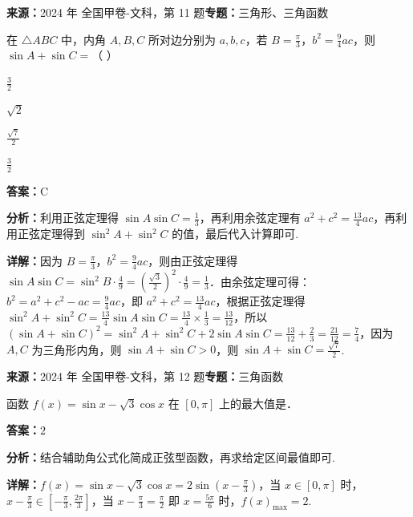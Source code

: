 \begin{question}[points=5]
\textbf{来源：}2024 年 全国甲卷-文科，第 11 题\quad \textbf{专题：}三角形、三角函数\par
在 $\triangle ABC$ 中，内角 $A, B, C$ 所对边分别为 $a, b, c$，若 $B = \frac{\pi}{3}$，$b^2 = \frac{9}{4}ac$，则 $\sin A + \sin C =$（ ）
\begin{choices}
  \item $\frac{3}{2}$
  \item $\sqrt{2}$
  \item $\frac{\sqrt{7}}{2}$
  \item $\frac{3}{2}$
\end{choices}
\begin{solution}
\textbf{答案：}C

\textbf{分析：}利用正弦定理得 $\sin A \sin C = \frac{1}{3}$，再利用余弦定理有 $a^2 + c^2 = \frac{13}{4}ac$，再利用正弦定理得到 $\sin^2 A + \sin^2 C$ 的值，最后代入计算即可.

\textbf{详解：}因为 $B = \frac{\pi}{3}$，$b^2 = \frac{9}{4}ac$，则由正弦定理得 $\sin A \sin C = \sin^2 B \cdot \frac{4}{9} = \left(\frac{\sqrt{3}}{2}\right)^2 \cdot \frac{4}{9} = \frac{1}{3}$．由余弦定理可得：$b^2 = a^2 + c^2 - ac = \frac{9}{4}ac$，即 $a^2 + c^2 = \frac{13}{4}ac$，根据正弦定理得 $\sin^2 A + \sin^2 C = \frac{13}{4} \sin A \sin C = \frac{13}{4} \times \frac{1}{3} = \frac{13}{12}$，所以 $(\sin A + \sin C)^2 = \sin^2 A + \sin^2 C + 2\sin A \sin C = \frac{13}{12} + \frac{2}{3} = \frac{21}{12} = \frac{7}{4}$，因为 $A, C$ 为三角形内角，则 $\sin A + \sin C > 0$，则 $\sin A + \sin C = \frac{\sqrt{7}}{2}$.
\end{solution}
\end{question}

\begin{question}[points=5]
\textbf{来源：}2024 年 全国甲卷-文科，第 12 题\quad \textbf{专题：}三角函数\par
函数 $f(x) = \sin x - \sqrt{3} \cos x$ 在 $[0, \pi]$ 上的最大值是．
\fillin[{$2$}]
\begin{solution}
\textbf{答案：}$2$

\textbf{分析：}结合辅助角公式化简成正弦型函数，再求给定区间最值即可.

\textbf{详解：}$f(x) = \sin x - \sqrt{3} \cos x = 2\sin\left(x - \frac{\pi}{3}\right)$，当 $x \in [0, \pi]$ 时，$x - \frac{\pi}{3} \in [-\frac{\pi}{3}, \frac{2\pi}{3}]$，当 $x - \frac{\pi}{3} = \frac{\pi}{2}$ 即 $x = \frac{5\pi}{6}$ 时，$f(x)_{\max} = 2$.
\end{solution}
\end{question}

